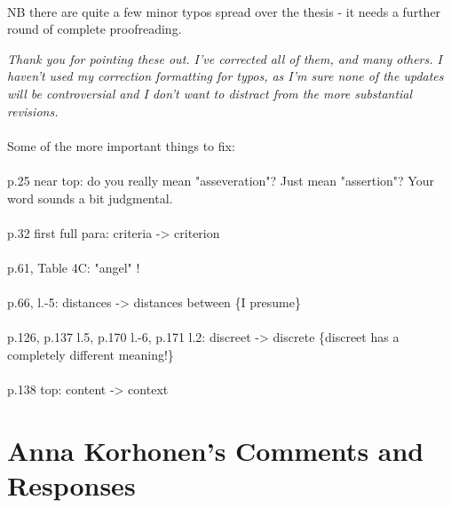 \documentclass[11pt,a4paper]{article}
\newcommand{\res}[1]{\vspace{0.25cm} \begin{adjustwidth}{1cm}{}\emph{#1}\end{adjustwidth}}
\begin{document}
\paragraph{}NB there are quite a few minor typos spread over the thesis - it needs a further round of complete proofreading.

\res{Thank you for pointing these out.  I've corrected all of them, and many others.  I haven't used my correction formatting for typos, as I'm sure none of the updates will be controversial and I don't want to distract from the more substantial revisions.}

\paragraph{} Some of the more important things to fix:

\paragraph{} p.25 near top: do you really mean "asseveration"? Just mean "assertion"? Your word sounds a bit judgmental.

\paragraph{} p.32 first full para:  criteria -> criterion

\paragraph{} p.61, Table 4C: "angel" !

\paragraph{} p.66, l.-5: distances -> distances between \{I presume\}

\paragraph{} p.126,   p.137 l.5,   p.170 l.-6,   p.171 l.2: discreet -> discrete \{discreet has a completely different meaning!\}

\paragraph{} p.138 top: content -> context 


\section{Anna Korhonen's Comments and Responses}
\end{document}

